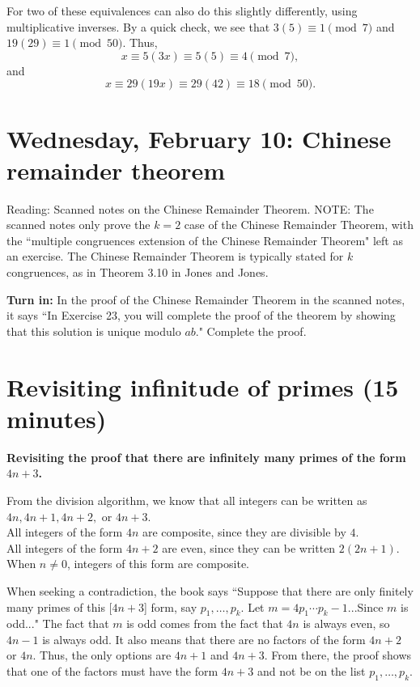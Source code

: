 \documentclass[letterpaper, 11 pt]{article}
\begin{document}
For two of these equivalences can also do this slightly differently, using multiplicative inverses. By a quick check, we see that $3(5)\equiv 1\pmod 7$ and $19(29)\equiv 1\pmod{50}$. Thus, \[x\equiv5(3x)\equiv 5(5)\equiv 4 \pmod 7,\] and \[x\equiv 29(19x)\equiv 29(42) \equiv 18\pmod{50}.\]


\section{Wednesday, February 10: Chinese remainder theorem}
Reading: Scanned notes on the Chinese Remainder Theorem. NOTE: The scanned notes only prove the $k=2$ case of the Chinese Remainder Theorem, with the ``multiple congruences extension of the Chinese Remainder Theorem" left as an exercise. The Chinese Remainder Theorem is typically stated for $k$ congruences, as in Theorem 3.10 in Jones and Jones.

{\bf Turn in:} In the proof of the Chinese Remainder Theorem in the scanned notes, it says ``In Exercise 23, you will complete the proof of the theorem by showing that this solution is unique modulo $ab$." Complete the proof.
\section*{Revisiting infinitude of primes (15 minutes)}
{\bf Revisiting the proof that there are infinitely many primes of the form $4n+3$.}

From the division algorithm, we know that all integers can be written as $4n, 4n+1, 4n+2,$ or $4n+3$. 
\\All integers of the form $4n$ are composite, since they are divisible by $4$.
\\All integers of the form $4n+2$ are even, since they can be written $2(2n+1)$. When $n\neq0$, integers of this form are composite. 

When seeking a contradiction, the book says ``Suppose that there are only finitely many primes of this [$4n+3$] form, say $p_1,\dots, p_k$. Let $m=4p_1\cdots p_k -1$...Since $m$ is odd..." The fact that $m$ is odd comes from the fact that $4n$ is always even, so $4n-1$ is always odd. It also means that there are no factors of the form $4n+2$ or $4n$. Thus, the only options are $4n+1$ and $4n+3$. From there, the proof shows that one of the factors must have the form $4n+3$ and not be on the list $p_1,\dots, p_k$.
\end{document}
